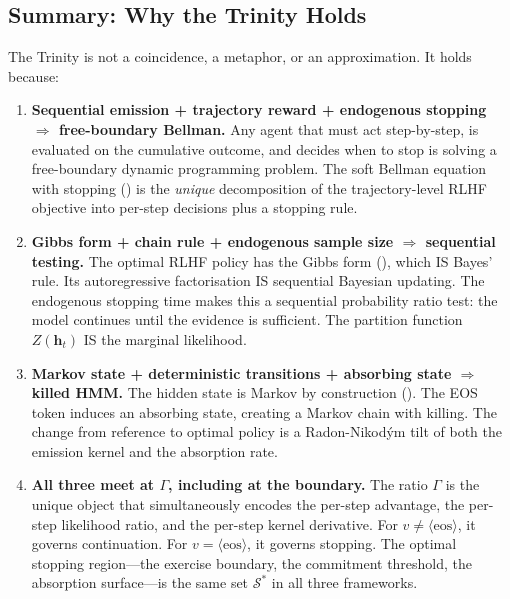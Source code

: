 \documentclass[11pt,a4paper]{article}
\theoremstyle{plain}
\theoremstyle{definition}
\theoremstyle{remark}
\newcommand{\cS}{\mathcal{S}}
\begin{document}
\subsection{Summary: Why the Trinity Holds}

The Trinity is not a coincidence, a metaphor, or an approximation. It holds
because:

\begin{enumerate}[nosep]
  \item \textbf{Sequential emission + trajectory reward + endogenous stopping
        $\Rightarrow$ free-boundary Bellman.}
        Any agent that must act step-by-step, is evaluated on the
        cumulative outcome, and decides when to stop is solving a
        free-boundary dynamic programming problem. The soft Bellman
        equation with stopping () is the
        \emph{unique} decomposition of the trajectory-level RLHF objective
        into per-step decisions plus a stopping rule.

  \item \textbf{Gibbs form + chain rule + endogenous sample size
        $\Rightarrow$ sequential testing.}
        The optimal RLHF policy has the Gibbs form
        (), which IS Bayes' rule. Its autoregressive
        factorisation IS sequential Bayesian updating. The endogenous
        stopping time makes this a sequential probability ratio test:
        the model continues until the evidence is sufficient.
        The partition function $Z(\bm{h}_t)$ IS the marginal likelihood.

  \item \textbf{Markov state + deterministic transitions + absorbing state
        $\Rightarrow$ killed HMM.}
        The hidden state is Markov by construction ().
        The EOS token induces an absorbing state, creating a Markov chain
        with killing. The change from reference to optimal policy is a
        Radon-Nikod\'ym tilt of both the emission kernel and the
        absorption rate.

  \item \textbf{All three meet at $\Gamma$, including at the boundary.}
        The ratio $\Gamma$ is the unique object that simultaneously
        encodes the per-step advantage, the per-step likelihood ratio,
        and the per-step kernel derivative. For $v \neq
        \langle\mathrm{eos}\rangle$, it governs continuation. For
        $v = \langle\mathrm{eos}\rangle$, it governs stopping. The
        optimal stopping region---the exercise boundary, the commitment
        threshold, the absorption surface---is the same set $\cS^*$ in
        all three frameworks.
\end{enumerate}
\end{document}
